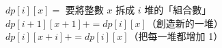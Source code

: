 $dp[i][x] = $ 要將整數 $x$ 拆成 $i$ 堆的「組合數」\\

\noindent
$dp[i+1][x+1] += dp[i][x]$（創造新的一堆）\\
$dp[i][x+i] += dp[i][x]$（把每一堆都增加 1）